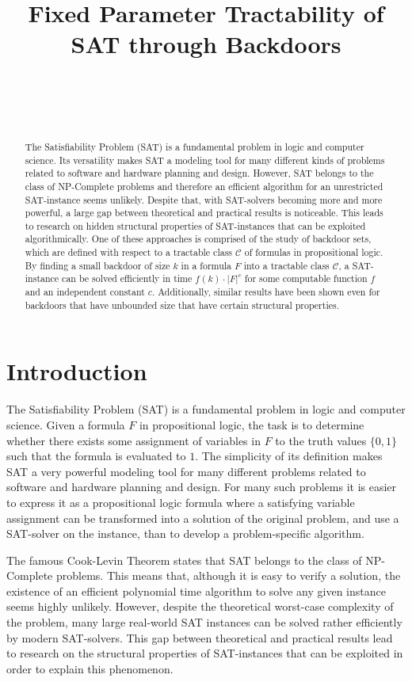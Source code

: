 \documentclass[11pt,a4paper]{article}
\title{Fixed Parameter Tractability of SAT through Backdoors}
\author{
 \authorname{Rupert Ettrich} \\
 \studentnumber{01129393} \\
 \curriculum{066 931 Logic and Computation} \\
 \email{rupert.ettrich@gmail.com}
}
\theoremstyle{definition}
\theoremstyle{proposition}
\begin{document}
\maketitle

\begin{abstract}
The Satisfiability Problem (SAT) is a fundamental problem in logic and computer science. Its versatility makes SAT a modeling tool for many different kinds of problems related to software and hardware planning and design. However, SAT belongs to the class of NP-Complete problems and therefore an efficient algorithm for an unrestricted SAT-instance seems unlikely. Despite that, with SAT-solvers becoming more and more powerful, a large gap between theoretical and practical results is noticeable. This leads to research on hidden structural properties of SAT-instances that can be exploited algorithmically. One of these approaches is comprised of the study of backdoor sets, which are defined with respect to a tractable class $\mathcal{C}$ of formulas in propositional logic. By finding a small backdoor of size $k$ in a formula $F$ into a tractable class $\mathcal{C}$, a SAT-instance can be solved efficiently in time $f(k) \cdot |F|^c$ for some computable function $f$ and an independent constant $c$. Additionally, similar results have been shown even for backdoors that have unbounded size that have certain structural properties.
\end{abstract}

\section{Introduction}

The Satisfiability Problem (SAT) is a fundamental problem in logic and computer science. Given a formula $F$ in propositional logic, the task is to determine whether there exists some assignment of variables in $F$ to the truth values $\{0,1\}$ such that the formula is evaluated to $1$. The simplicity of its definition makes SAT a very powerful modeling tool for many different problems related to software and hardware planning and design. For many such problems it is easier to express it as a propositional logic formula where a satisfying variable assignment can be transformed into a solution of the original problem, and use a SAT-solver on the instance, than to develop a problem-specific algorithm. 

The famous Cook-Levin Theorem \cite{Cook71, Levin73} states that SAT belongs to the class of NP-Complete problems. This means that, although it is easy to verify a solution, the existence of an efficient polynomial time algorithm to solve any given instance seems highly unlikely. However, despite the theoretical worst-case complexity of the problem, many large real-world SAT instances can be solved rather efficiently by modern SAT-solvers. This gap between theoretical and practical results lead to research on the structural properties of SAT-instances that can be exploited in order to explain this phenomenon. 
\end{document}
